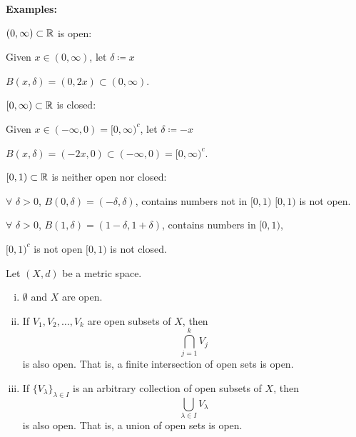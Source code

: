 \documentclass[10pt,aspectratio=149]{beamer}
\begin{document}
\begin{frame}

\textbf{Examples:}

\pause
\medskip

$(0,\infty) \subset {\mathbb{R}}$ is open:

\pause
Given $x \in (0,\infty)$,
let $\delta \coloneqq x$

\pause
\thus \quad
 $B(x,\delta) = (0,2x) \subset (0,\infty)$.

\pause
\medskip

$[0,\infty) \subset {\mathbb{R}}$ is closed:

\pause
Given $x \in (-\infty,0) =
[0,\infty)^c$,
let $\delta \coloneqq -x$

\pause
\thus \quad
 $B(x,\delta) = (-2x,0) \subset
(-\infty,0) = [0,\infty)^c$.

\pause
\medskip

$[0,1) \subset {\mathbb{R}}$ is neither open nor closed:

\pause
$\forall$ $\delta > 0$, $B(0,\delta) = (-\delta,\delta)$, contains numbers
not in $[0,1)$
\pause
\hfill \thus \hfill $[0,1)$ is not open.

\pause
$\forall$ $\delta > 0$,
$B(1,\delta) = (1-\delta,1+\delta)$, contains
numbers in $[0,1)$,

\pause
\thus \quad $[0,1)^c$ is not open \wthus $[0,1)$ is not closed.

\end{frame}

\begin{frame}
\begin{proposition}
Let $(X,d)$ be a metric space.
\begin{enumerate}[(i)]
\item
\pause
\label{topology:openi} $\emptyset$ and $X$ are open.
\item
\pause
\label{topology:openii} If $V_1, V_2, \ldots, V_k$ are open subsets of $X$, then
\begin{equation*}
\bigcap_{j=1}^k V_j
\end{equation*}
is also open.  That is, a finite intersection of open sets is open.
\item
\pause
\label{topology:openiii} If $\{ V_\lambda \}_{\lambda \in I}$ is
an arbitrary collection of open subsets of $X$, then
\begin{equation*}
\bigcup_{\lambda \in I} V_\lambda
\end{equation*}
is also open.  That is, a union of open sets is open.
\end{enumerate}
\end{proposition}


\end{frame}
\end{document}
